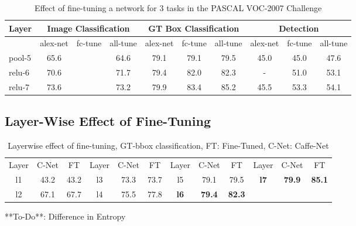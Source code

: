 \documentclass[runningheads]{llncs}
\begin{document}
\setlength{\tabcolsep}{2pt}
\begin{table}
\begin{center}
\caption{Effect of fine-tuning a network for 3 tasks in the PASCAL VOC-2007 Challenge}
\label{table:fine-effect}
\begin{tabular}{l|ccc|ccc|ccc}
\hline\noalign{\smallskip}
Layer & \multicolumn{3}{c}{Image Classification}  & \multicolumn{3}{c}{GT Box Classification} & \multicolumn{3}{c}{Detection} \\
\hline
      & alex-net & fc-tune & all-tune & alex-net & fc-tune & all-tune & alex-net & fc-tune & all-tune \\
\hline
pool-5   & 65.6 & & 64.6 & 79.1 & 79.1 & 79.5 & 45.0 & 45.0 & 47.6 \\
relu-6   & 70.6 & & 71.7 & 79.4 & 82.0 & 82.3 &  - & 51.0 & 53.1  \\
relu-7   & 73.6 & & 73.2 & 79.9 & 83.4 & 85.2  & 45.5 & 53.3 & 54.1 \\
\hline
\end{tabular}
\end{center}
\end{table}
\setlength{\tabcolsep}{1.4pt}



\subsection{Layer-Wise Effect of Fine-Tuning}

\setlength{\tabcolsep}{4pt}
\begin{table}
\begin{center}
\caption{Layerwise effect of fine-tuning, GT-bbox classification, FT: Fine-Tuned, C-Net: Caffe-Net}
\label{table:headings}
\begin{tabular}{ccc|ccc|ccc|ccc}
\hline\noalign{\smallskip}
Layer & C-Net & FT & Layer & C-Net & FT & Layer & C-Net & FT & Layer & C-Net & FT \\
\noalign{\smallskip}
\hline
\noalign{\smallskip}
l1 & 43.2 & 43.2 & l3 & 73.3 & 73.7 & l5 & 79.1 & 79.5 & \textbf{l7} & \textbf{79.9} & \textbf{85.1} \\
l2 & 67.1 & 67.7 & l4 & 75.5 & 77.8 & \textbf{l6} & \textbf{79.4} & \textbf{82.3} \\
\hline
\end{tabular}
\end{center}
\end{table}
\setlength{\tabcolsep}{1.4pt}

**To-Do**: Difference in Entropy
\end{document}
